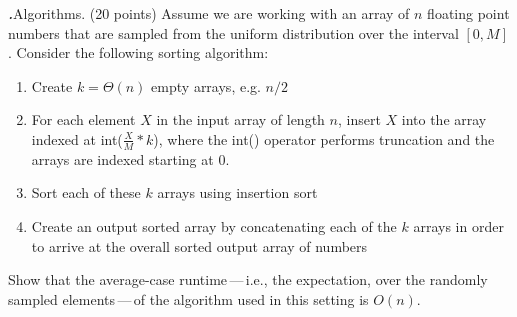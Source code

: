 \documentclass[12pt]{amsart}
\newenvironment{statement}[1]{\smallskip\noindent\color[rgb]{0.0,0.0,0.0} {\bf #1.}}{}
\theoremstyle{definition}
\theoremstyle{remark}
\newcommand{\1}{\mathds{1}}
\begin{document}
\newpage
\begin{statement}{2}
\emph{Algorithms.} (20 points) Assume we are working with an array of $n$ floating point numbers that are sampled from the uniform distribution over the interval $[0,M]$. Consider the following sorting algorithm:
\begin{enumerate}
    \item Create $k = \Theta(n)$ empty arrays, e.g. $n/2$
    \item For each element $X$ in the input array of length $n$, insert $X$ into the array indexed at int($\frac{X}{M}*k$), where the int() operator performs truncation and the arrays are indexed starting at 0. 
    \item Sort each of these $k$ arrays using insertion sort
    \item Create an output sorted array by concatenating each of the $k$ arrays in order to arrive at the overall sorted output array of numbers
\end{enumerate}
Show that the average-case runtime\,---\,i.e., the expectation, over the randomly sampled elements\,---\,of the algorithm used in this setting is $O(n)$. 


\end{statement}
\end{document}
